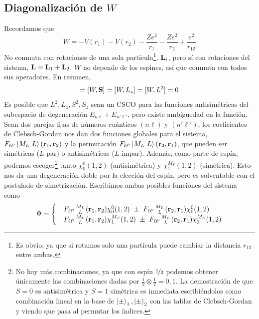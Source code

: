 \subsection{Diagonalización de $W$}
Recordamos que
\begin{equation}
  W = -V(r_1) - V(r_2) - \frac{Ze^2}{r_1} - \frac{Ze^2}{r_2} + \frac{e^2}{r_{12}}
\end{equation}
No conmuta con rotaciones de una sola partícula\footnote{Es obvio, ya
  que si rotamos solo una partícula puede cambiar la distancia
  $r_{12}$ entre ambas.}, $\bm{\mathrm{L}}_i$,
pero sí con rotaciones del sistema, $\bm{\mathrm{L}} =
\bm{\mathrm{L}}_1+\bm{\mathrm{L}}_2$. $W$ no depende de los espines, así que
conmuta con todos sus operadores. En resumen, 
\begin{equation}
  [W,\boldrm{L}]=[W,\boldrm{S}]=[W,L_z]=[W,L^2] = 0
\end{equation}
Es posible que $L^2,L_z,S^2,S_z$ sean un CSCO para las
funciones antisimétricas del subespacio de degeneración
$E_{n\ell}+E_{n'\ell'}$, pero existe ambiguedad en la función. 
Sean dos parejas fijas de
números cuánticos $(n\ell)$ y $(n'\ell')$, los coeficientes de
Clebsch-Gordan nos dan dos funciones globales para el sistema,
$F_{\ell\ell'}\ket{M_L\ L}(\boldrm{r}_1,\boldrm{r}_2)$ y la
permutación $F_{\ell\ell'}\ket{M_L\ L}(\boldrm{r}_2,\boldrm{r}_1)$,
que pueden ser simétricas ($L$ par) o antisimétricas ($L$ impar).
Además, como parte de espín, podemos escoger\footnote{No hay más combinaciones, ya
  que con espín ${\nicefrac{1}{2}}$ podemos obtener únicamente las combinaciones
  dadas por $\frac{1}{2} \otimes \frac{1}{2} = 0,1$. La demostración
  de que $S=0$ es antisimétrica y $S=1$ simétrica es inmediata
  escribiéndolos como combinación lineal en la base de
  $\ket{\pm}_1,\ket{\pm}_2$ con las tablas de Clebsch-Gordan y viendo
  que pasa al permutar los índices.} tanto  $\chi_0^0(1,2)$ (antisimétrica) y
$\chi_1^{M_S}(1,2)$ (simétrica). Esto nos da una degeneración doble
por la elección del espín,
pero es solventable con el postulado de simetrización. Escribimos
ambas posibles funciones del sistema como
\begin{equation}
  \Psi =
  \begin{cases}
&F_{\ell\ell'} {M_L \atop L}(\boldrm{r}_1,\boldrm{r}_2) \chi_0^0(1,2)\ 
\pm  \
F_{\ell\ell'}{M_L\atop L}(\boldrm{r}_2,\boldrm{r}_1) \chi_0^0(1,2) \\
&F_{\ell\ell'} {M_L \atop L}(\boldrm{r}_1,\boldrm{r}_2) \chi_1^{M_S}(1,2)\ 
\pm  \
F_{\ell\ell'}{M_L\atop L}(\boldrm{r}_2,\boldrm{r}_1) \chi_1^{M_S}(1,2) 
  \end{cases}
  \label{eq:psicases}
\end{equation}

